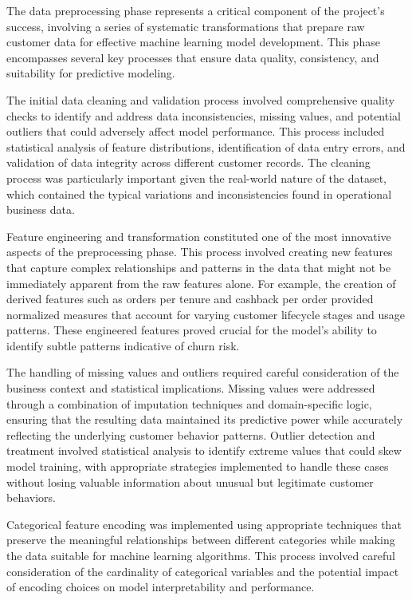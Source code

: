 \documentclass{article}
\begin{document}
The data preprocessing phase represents a critical component of the project's success, involving a series of systematic transformations that prepare raw customer data for effective machine learning model development. This phase encompasses several key processes that ensure data quality, consistency, and suitability for predictive modeling.

The initial data cleaning and validation process involved comprehensive quality checks to identify and address data inconsistencies, missing values, and potential outliers that could adversely affect model performance. This process included statistical analysis of feature distributions, identification of data entry errors, and validation of data integrity across different customer records. The cleaning process was particularly important given the real-world nature of the dataset, which contained the typical variations and inconsistencies found in operational business data.

Feature engineering and transformation constituted one of the most innovative aspects of the preprocessing phase. This process involved creating new features that capture complex relationships and patterns in the data that might not be immediately apparent from the raw features alone. For example, the creation of derived features such as orders per tenure and cashback per order provided normalized measures that account for varying customer lifecycle stages and usage patterns. These engineered features proved crucial for the model's ability to identify subtle patterns indicative of churn risk.

The handling of missing values and outliers required careful consideration of the business context and statistical implications. Missing values were addressed through a combination of imputation techniques and domain-specific logic, ensuring that the resulting data maintained its predictive power while accurately reflecting the underlying customer behavior patterns. Outlier detection and treatment involved statistical analysis to identify extreme values that could skew model training, with appropriate strategies implemented to handle these cases without losing valuable information about unusual but legitimate customer behaviors.

Categorical feature encoding was implemented using appropriate techniques that preserve the meaningful relationships between different categories while making the data suitable for machine learning algorithms. This process involved careful consideration of the cardinality of categorical variables and the potential impact of encoding choices on model interpretability and performance.
\end{document}
